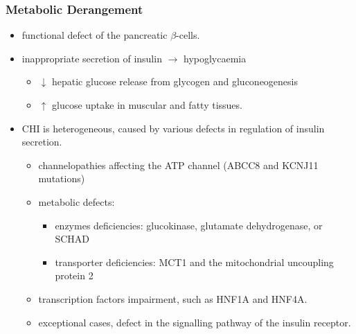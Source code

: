 \documentclass{scrartcl}
\begin{document}
\subsubsection{Metabolic Derangement}
\label{sec:org6836b9b}
\begin{itemize}
\item functional defect of the pancreatic \(\beta\)-cells.
\item inappropriate secretion of insulin \(\to\) hypoglycaemia
\begin{itemize}
\item \(\downarrow\) hepatic glucose release from glycogen and gluconeogenesis
\item \(\uparrow\) glucose uptake in muscular and fatty tissues.
\end{itemize}
\item CHI is heterogeneous, caused by various defects in regulation of insulin secretion.
\begin{itemize}
\item channelopathies affecting the ATP channel (ABCC8 and KCNJ11 mutations)
\item metabolic defects:
\begin{itemize}
\item enzymes deficiencies: glucokinase, glutamate dehydrogenase, or SCHAD
\item transporter deficiencies: MCT1 and the mitochondrial uncoupling protein 2
\end{itemize}
\item transcription factors impairment, such as HNF1A and HNF4A.
\item exceptional cases, defect in the signalling pathway of the insulin
receptor.
\end{itemize}
\end{itemize}
\end{document}
